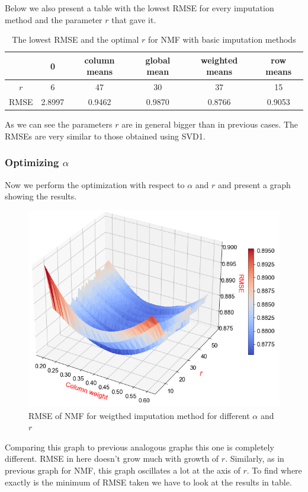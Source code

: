 \documentclass[10pt]{amsart}
\begin{document}
Below we also present a table with the lowest RMSE for every imputation method and the parameter $r$ that gave it.

\begin{table}[H]
\begin{tabular}{c|ccccc}
& 0 & column means & global mean & weighted means & row means \\
\hline
$r$ & 6 & 47 & 30 & 37 & 15\\
RMSE & 2.8997 & 0.9462 & 0.9870 & 0.8766 & 0.9053 \\
\end{tabular}
\caption{The lowest RMSE and the optimal $r$ for NMF with basic imputation methods}
\end{table}

As we can see the parameters $r$ are in general bigger than in previous cases.
The RMSEs are very similar to those obtained using SVD1.

\subsubsection*{Optimizing $\alpha$}
Now we perform the optimization with respect to $\alpha$ and $r$ and present a graph showing the results.

\begin{figure}[H]
\includegraphics[scale = 0.54]{nmf_r_w2}
\caption{RMSE of NMF for weigthed imputation method for different $\alpha$ and $r$}
\end{figure}

Comparing this graph to previous analogous graphs this one is completely different.
RMSE in here doesn't grow much with growth of $r$.
Similarly, as in previous graph for NMF, this graph oscillates a lot at the axis of $r$.
To find where exactly is the minimum of RMSE taken we have to look at the results in table.
\end{document}
